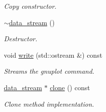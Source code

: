 \begin{DoxyCompactItemize}
\begin{DoxyCompactList}\small\item\em Copy constructor. \end{DoxyCompactList}\item 
\hypertarget{a00117_a9d0a6d6486e6435cc154ee864e769272}{\hyperlink{a00117_a9d0a6d6486e6435cc154ee864e769272}{$\sim$data\-\_\-stream} ()}\label{a00117_a9d0a6d6486e6435cc154ee864e769272}

\begin{DoxyCompactList}\small\item\em Destructor. \end{DoxyCompactList}\item 
\hypertarget{a00117_ad2c77ea77b290ce3cc0290455960dad4}{void \hyperlink{a00117_ad2c77ea77b290ce3cc0290455960dad4}{write} (std\-::ostream \&) const }\label{a00117_ad2c77ea77b290ce3cc0290455960dad4}

\begin{DoxyCompactList}\small\item\em Streams the gnuplot command. \end{DoxyCompactList}\item 
\hypertarget{a00117_af05ed243a7f75a7a7362a7f09f343a41}{\hyperlink{a00117}{data\-\_\-stream} $\ast$ \hyperlink{a00117_af05ed243a7f75a7a7362a7f09f343a41}{clone} () const }\label{a00117_af05ed243a7f75a7a7362a7f09f343a41}

\begin{DoxyCompactList}\small\item\em Clone method implementation. \end{DoxyCompactList}\end{DoxyCompactItemize}
